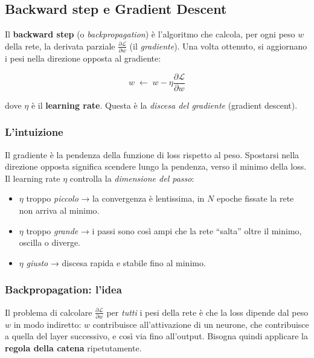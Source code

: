 \documentclass[11pt,a4paper]{article}
\begin{document}
\subsection{Backward step e Gradient Descent}

Il \textbf{backward step} (o \emph{backpropagation}) è l'algoritmo che
calcola, per ogni peso $w$ della rete, la derivata parziale
$\frac{\partial \mathcal{L}}{\partial w}$ (il \emph{gradiente}). Una volta
ottenuto, si aggiornano i pesi nella direzione opposta al gradiente:

\begin{equation}
    w \;\leftarrow\; w - \eta \frac{\partial \mathcal{L}}{\partial w}
\end{equation}

dove $\eta$ è il \textbf{learning rate}. Questa è la \emph{discesa del
gradiente} (gradient descent).

\subsubsection{L'intuizione}

Il gradiente è la pendenza della funzione di loss rispetto al peso.
Spostarsi nella direzione opposta significa scendere lungo la pendenza,
verso il minimo della loss. Il learning rate $\eta$ controlla la
\emph{dimensione del passo}:

\begin{itemize}
    \item $\eta$ troppo \emph{piccolo} → la convergenza è lentissima, in
          $N$ epoche fissate la rete non arriva al minimo.
    \item $\eta$ troppo \emph{grande} → i passi sono così ampi che la
          rete ``salta'' oltre il minimo, oscilla o diverge.
    \item $\eta$ \emph{giusto} → discesa rapida e stabile fino al minimo.
\end{itemize}

\subsubsection{Backpropagation: l'idea}

Il problema di calcolare $\frac{\partial \mathcal{L}}{\partial w}$ per
\emph{tutti} i pesi della rete è che la loss dipende dal peso $w$ in modo
indiretto: $w$ contribuisce all'attivazione di un neurone, che contribuisce
a quella del layer successivo, e così via fino all'output. Bisogna quindi
applicare la \textbf{regola della catena} ripetutamente.
\end{document}
